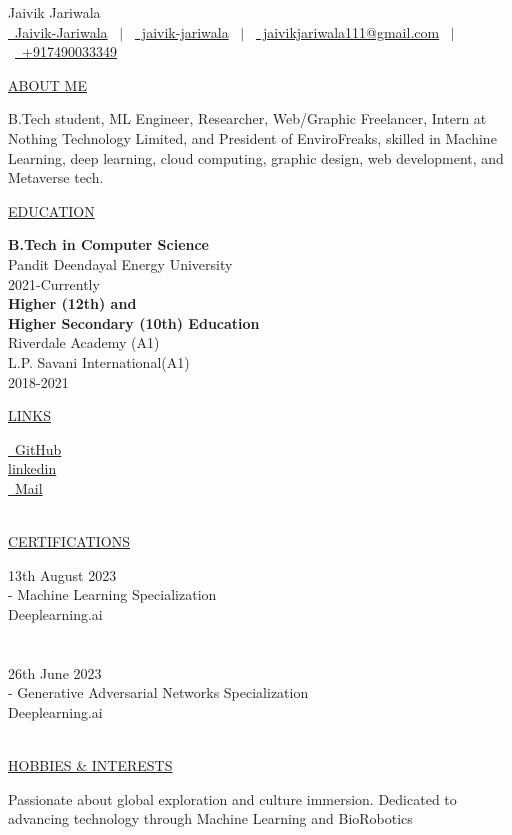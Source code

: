 \documentclass[11pt]{article}
\newcommand{\resumetitle}[3]{
    \AddToShipoutPictureBG{
        \AtPageUpperLeft {
        \raisebox{-0.09\paperheight}{
            \color{black!85}\rule{2\paperwidth}{\paperheight}}
        }}
    \begin{Center}
        \begingroup
        \titlethin
        \color{black!10}\Huge{#1}
        \titlethick
        \color{black!5}\Huge{#2} \\
        \vspace{2mm}
        \textrm{\color{black!15}\Large{#3}}
        \endgroup
    \end{Center}
    \vspace{7mm}
}
\newcommand{\betteruline}[1]{
    \uline{#1}
}
\newcommand{\sectiontitle}[1]{
    \begingroup
        \titlebold
        \betteruline{\Large\uppercase{#1}  }
        \vspace{1.7mm}
    \endgroup
}
\newcommand{\sectioncontent}[1]{
    \begingroup
        \begin{FlushLeft}
        \vspace{-3mm}
        \sffamily\small#1
        \end{FlushLeft}
    \endgroup
    \vspace{2mm}
}
\newcommand{\honor}[2]{
    \textcolor{black!70}{#1} - #2 \\
    \vspace{1.5mm}
}
\begin{document}
    \resumetitle{Jaivik}{Jariwala} {
        \href{https://github.com/Jaivik-Jariwala}{\raisebox{-0.05\height}\faGithub\ Jaivik-Jariwala} \ $|$ \ 
        \href{https://linkedin.com/in/jaivik-jariwala}{\raisebox{-0.05\height}\faLinkedin\ jaivik-jariwala} \ $|$ \ 
        \href{mailto:jaivikjariwala111@gmail.com}{\raisebox{-0.05\height}\faEnvelope \ jaivikjariwala111@gmail.com} \ $|$ \ 
        \href{tel:+917490033349}{\raisebox{-0.05\height}\faMobile \ +917490033349} \\
        }

    \columnratio{0.31}
    \setlength{\columnsep}{7mm}
    \begin{paracol}{2}

    \sectiontitle{about me}
    \sectioncontent{
        B.Tech student, ML Engineer, Researcher, Web/Graphic Freelancer, Intern at Nothing Technology Limited, and President of EnviroFreaks, skilled in Machine Learning, deep learning, cloud computing, graphic design, web development, and Metaverse tech.
    }

    \sectiontitle{education}
    \sectioncontent{
        \textbf{B.Tech in Computer Science} \\
        Pandit Deendayal Energy University \\
        \textcolor{black!70}{2021-Currently} \\
        \vspace{2mm}
        \textbf{Higher (12th) and \\
        Higher Secondary (10th) Education } \\
        Riverdale Academy (A1)\\
        L.P. Savani International(A1)\\
        \textcolor{black!70}{2018-2021} \\
    }

    \sectiontitle{links}
    \sectioncontent{
        \href{https://github.com/Jaivik-Jariwala}{\raisebox{-0.05\height}\faGithub\ GitHub} \hspace{2.1mm} \\
        \faIcon{linkedin}
        \href{https://linkedin.com/in/jaivik-jariwala}{linkedin} \\
        \href{mailto:jaivikjariwala111@gmail.com}{\raisebox{-0.05\height}\faEnvelope \ Mail} \\\
    }
    \sectiontitle{Certifications}
    \sectioncontent{
        \honor{13th August 2023\\}{Machine Learning Specialization \\ Deeplearning.ai}\\
        \\
        \honor{26th June 2023\\}{Generative Adversarial Networks Specialization \\ Deeplearning.ai}\\
    }
    \sectiontitle{Hobbies \& Interests}
    \sectioncontent{
       Passionate about global exploration and culture immersion. Dedicated to advancing technology through Machine Learning and BioRobotics\\
    }


\end{paracol}
\end{document}
